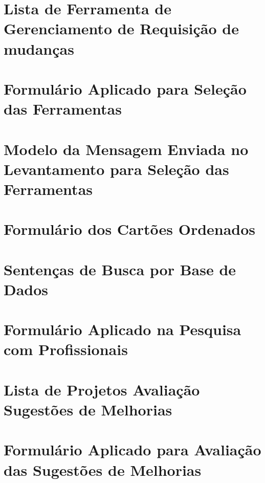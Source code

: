 \begin{appendices}

\chapter{Lista de Ferramenta de Gerenciamento de Requisição de mudanças}\label{ch:app-lista-fgrm}


\chapter{Formulário Aplicado para Seleção das Ferramentas}\label{ch:app-form-selecao-ferramentas}


\chapter{Modelo da Mensagem Enviada no Levantamento para Seleção das
    Ferramentas}\label{ch:app-template-msg-sel-ferrramentas}


\chapter{Formulário dos Cartões Ordenados}\label{ch:app-form-cartoes-ordenados}


\chapter{Sentenças de Busca por Base de Dados}\label{ch:app-setenca-de-busca-base-dados}


\chapter{Formulário Aplicado na Pesquisa com Profissionais}\label{ch:app-form-pesq-profissionais}


\chapter{Lista de Projetos Avaliação Sugestões de Melhorias}\label{ch:app-tb-lista-projetos-sug-melhorias}


\chapter{Formulário Aplicado para Avaliação das Sugestões de Melhorias}\label{ch:app-form-sug-melhorias}


\end{appendices}
